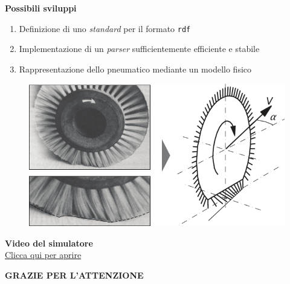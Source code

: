 \documentclass[xcolor=dvipsnames]{beamer} %
\begin{document}
\begin{frame}
	\Large{\textbf{Possibili sviluppi}}
	\normalsize
	\begin{enumerate}
		\item Definizione di uno \textit{standard} per il formato \texttt{rdf}
		\item Implementazione di un \textit{parser} sufficientemente efficiente e stabile
		\item Rappresentazione dello pneumatico mediante un modello fisico
	\end{enumerate}
	\begin{figure}
		\centering
		\includegraphics[width=0.5\linewidth]{../Figures/brush_model}
	\end{figure}
\end{frame}

\begin{frame}[fragile]
	\begin{center}
		\Large{\textbf{Video del simulatore}}\\
		\normalsize
			\href{run:./Video.mp4}{
				Clicca qui per aprire}
	\end{center}
\end{frame}

\begin{frame}[fragile]
	\begin{center}
		\Huge{\textbf{GRAZIE PER L'ATTENZIONE}}
	\end{center}
\end{frame}
\end{document}
